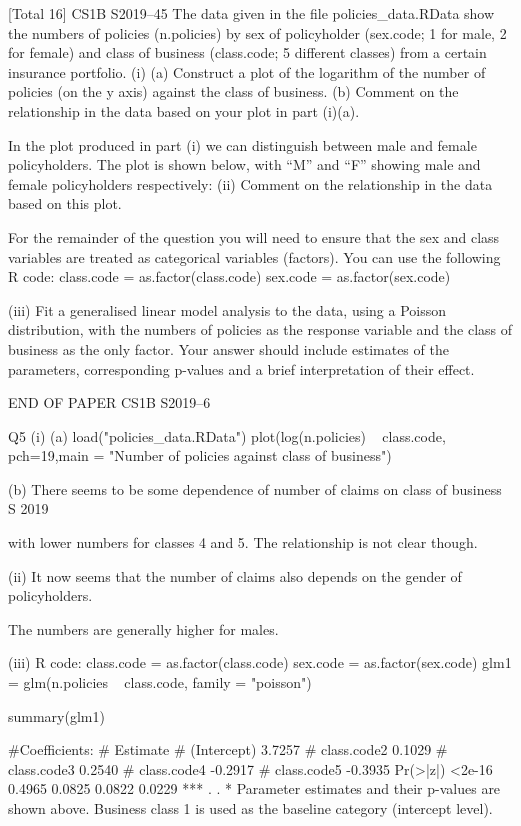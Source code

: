 [Total 16]
CS1B S2019–45
The data given in the file policies_data.RData show the numbers of policies
(n.policies) by sex of policyholder (sex.code; 1 for male, 2 for female)
and class of business (class.code; 5 different classes) from a certain insurance
portfolio.
(i)
(a)
Construct a plot of the logarithm of the number of policies (on the y
axis) against the class of business.
(b)
Comment on the relationship in the data based on your plot in
part (i)(a).

In the plot produced in part (i) we can distinguish between male and female
policyholders. The plot is shown below, with “M” and “F” showing male and female
policyholders respectively:
(ii)
Comment on the relationship in the data based on this plot.

For the remainder of the question you will need to ensure that the sex and class
variables are treated as categorical variables (factors). You can use the following R
code:
class.code = as.factor(class.code)
sex.code = as.factor(sex.code)

(iii) Fit a generalised linear model analysis to the data, using a Poisson distribution,
with the numbers of policies as the response variable and the class of business
as the only factor. Your answer should include estimates of the parameters,
corresponding p-values and a brief interpretation of their effect.




END OF PAPER
CS1B S2019–6


Q5
(i)
(a)
load("policies_data.RData")
plot(log(n.policies) ~ class.code, pch=19,main = "Number
of policies against class of business")


(b)
There seems to be some dependence of number of claims on class of business
S 2019

with lower numbers for classes 4 and 5.
The relationship is not clear though.


(ii) It now seems that the number of claims also depends on the gender of policyholders.

The numbers are generally higher for males.

(iii) R code:
class.code = as.factor(class.code)
sex.code = as.factor(sex.code)
glm1 = glm(n.policies ~ class.code, family = "poisson")

summary(glm1)

#Coefficients:
#
Estimate
# (Intercept)
3.7257
# class.code2
0.1029
# class.code3
0.2540
# class.code4 -0.2917
# class.code5 -0.3935
Pr(>|z|)
<2e-16
0.4965
0.0825
0.0822
0.0229
***
.
.
*
Parameter estimates and their p-values are shown above.
Business class 1 is used as the baseline category (intercept level).

